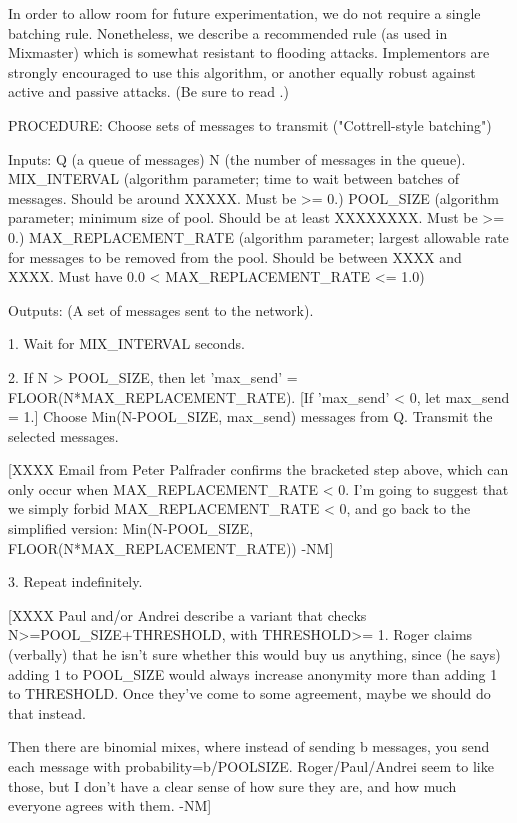 In order to allow room for future experimentation, we do not require a
single batching rule.  Nonetheless, we describe a recommended rule (as
used in Mixmaster) which is somewhat resistant to flooding attacks.
Implementors are strongly encouraged to use this algorithm, or another
equally robust against active and passive attacks.  (Be sure to read
\cite{batching-taxonomy}.)

PROCEDURE: Choose sets of messages to transmit ("Cottrell-style batching")

Inputs: Q (a queue of messages)
        N (the number of messages in the queue).
	MIX_INTERVAL (algorithm parameter; time to wait between
                      batches of messages.  Should be around
                      XXXXX. Must be >= 0.)
        POOL_SIZE (algorithm parameter; minimum size of pool.  Should
                   be at least XXXXXXXX.  Must be >= 0.)
        MAX_REPLACEMENT_RATE (algorithm parameter; largest allowable
                   rate for messages to be removed from the
                   pool. Should be between XXXX and XXXX.  Must have
                   0.0 < MAX_REPLACEMENT_RATE <= 1.0)

Outputs: (A set of messages sent to the network).

1. Wait for MIX_INTERVAL seconds.

2. If N > POOL_SIZE, then let 'max_send' = FLOOR(N*MAX_REPLACEMENT_RATE).
   [If 'max_send' < 0, let max_send = 1.]  Choose Min(N-POOL_SIZE, max_send)
   messages from Q.  Transmit the selected messages.

[XXXX Email from Peter Palfrader confirms the bracketed step above,
 which can only occur when MAX_REPLACEMENT_RATE < 0.  I'm going to
 suggest that we simply forbid MAX_REPLACEMENT_RATE < 0, and go back
 to the simplified version:
     Min(N-POOL_SIZE, FLOOR(N*MAX_REPLACEMENT_RATE)) -NM]

3. Repeat indefinitely.

[XXXX 
   Paul and/or Andrei describe a variant that checks N>=POOL_SIZE+THRESHOLD, 
   with THRESHOLD>= 1.  Roger claims (verbally) that he isn't sure whether
   this would buy us anything, since (he says) adding 1 to POOL_SIZE would
   always increase anonymity more than adding 1 to THRESHOLD.  Once they've
   come to some agreement, maybe we should do that instead.

   Then there are binomial mixes, where instead of sending b messages,
   you send each message with probability=b/POOLSIZE.  Roger/Paul/Andrei
   seem to like those, but I don't have a clear sense of how sure they are,
   and how much everyone agrees with them. -NM]
  
